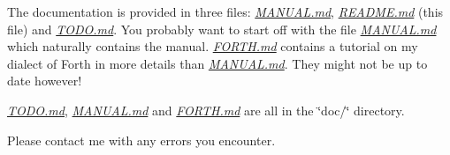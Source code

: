 The documentation is provided in three files\-: {\itshape \hyperlink{MANUAL_8md}{M\-A\-N\-U\-A\-L.\-md}}, {\itshape \hyperlink{README_8md}{R\-E\-A\-D\-M\-E.\-md}} (this file) and {\itshape \hyperlink{TODO_8md}{T\-O\-D\-O.\-md}}. You probably want to start off with the file {\itshape \hyperlink{MANUAL_8md}{M\-A\-N\-U\-A\-L.\-md}} which naturally contains the manual. {\itshape \hyperlink{FORTH_8md}{F\-O\-R\-T\-H.\-md}} contains a tutorial on my dialect of Forth in more details than {\itshape \hyperlink{MANUAL_8md}{M\-A\-N\-U\-A\-L.\-md}}. They might not be up to date however!

{\itshape \hyperlink{TODO_8md}{T\-O\-D\-O.\-md}}, {\itshape \hyperlink{MANUAL_8md}{M\-A\-N\-U\-A\-L.\-md}} and {\itshape \hyperlink{FORTH_8md}{F\-O\-R\-T\-H.\-md}} are all in the \char`\"{}doc/\char`\"{} directory.

Please contact me with any errors you encounter. 